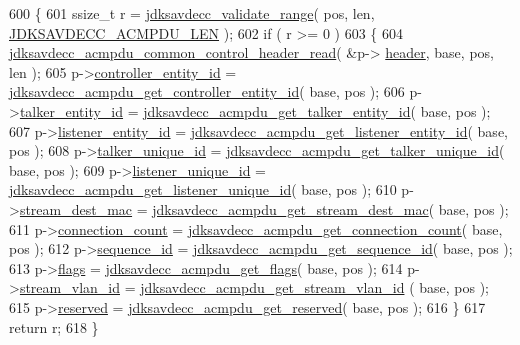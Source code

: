 \begin{DoxyCode}
600 \{
601     ssize\_t r = \hyperlink{group__util_ga9c02bdfe76c69163647c3196db7a73a1}{jdksavdecc\_validate\_range}( pos, len, 
      \hyperlink{group__acmpdu_ga0c49ae21aa302b2800dd04cffd57b475}{JDKSAVDECC\_ACMPDU\_LEN} );
602     \textcolor{keywordflow}{if} ( r >= 0 )
603     \{
604         \hyperlink{group__acmpdu_gaa999105ba3743fa5a7ff66fd2cf7574f}{jdksavdecc\_acmpdu\_common\_control\_header\_read}( &p->
      \hyperlink{structjdksavdecc__acmpdu_a2c237e845db12511d3ddd73770461bed}{header}, base, pos, len );
605         p->\hyperlink{structjdksavdecc__acmpdu_affc928ddb4fc62d1d04a775d36e5f2c8}{controller\_entity\_id} = 
      \hyperlink{group__acmpdu_ga4734ff28226ad92c7382a332e675d24e}{jdksavdecc\_acmpdu\_get\_controller\_entity\_id}( base, pos );
606         p->\hyperlink{structjdksavdecc__acmpdu_a5a263561481c86cc310ff078f7313b6d}{talker\_entity\_id} = 
      \hyperlink{group__acmpdu_ga9efe0b94b146760a8849d872d2a00da7}{jdksavdecc\_acmpdu\_get\_talker\_entity\_id}( base, pos );
607         p->\hyperlink{structjdksavdecc__acmpdu_ae204d36de673d5135ef97cc19a344b37}{listener\_entity\_id} = 
      \hyperlink{group__acmpdu_ga138eb586d71333fa5c27c226373c771f}{jdksavdecc\_acmpdu\_get\_listener\_entity\_id}( base, pos );
608         p->\hyperlink{structjdksavdecc__acmpdu_a0358bf4a1f59922974d1f0cb08fd8ef4}{talker\_unique\_id} = 
      \hyperlink{group__acmpdu_ga1f24a73adfcd4cf526ad8c10a6f2e42f}{jdksavdecc\_acmpdu\_get\_talker\_unique\_id}( base, pos );
609         p->\hyperlink{structjdksavdecc__acmpdu_a13c0b9c45a002c3c35ae4d85a3018c07}{listener\_unique\_id} = 
      \hyperlink{group__acmpdu_ga36867bfc130619cbea38caa3ce54bc89}{jdksavdecc\_acmpdu\_get\_listener\_unique\_id}( base, pos );
610         p->\hyperlink{structjdksavdecc__acmpdu_acb9f6beb748e2b0e9086f809a4b3143d}{stream\_dest\_mac} = 
      \hyperlink{group__acmpdu_gab4aa881e376764517889c5436d57e4d5}{jdksavdecc\_acmpdu\_get\_stream\_dest\_mac}( base, pos );
611         p->\hyperlink{structjdksavdecc__acmpdu_add60d6d8d5c6d6819002418e6e8404fa}{connection\_count} = 
      \hyperlink{group__acmpdu_ga28f4116aa95376ec5378febf22e830b5}{jdksavdecc\_acmpdu\_get\_connection\_count}( base, pos );
612         p->\hyperlink{structjdksavdecc__acmpdu_a8f184eb7c16a6d3a501c383ee8ffa200}{sequence\_id} = \hyperlink{group__acmpdu_gaf20d00ac6431b19d3f1213b4b6bf6fd5}{jdksavdecc\_acmpdu\_get\_sequence\_id}( 
      base, pos );
613         p->\hyperlink{structjdksavdecc__acmpdu_a1e87af3c18a2fd36c61faf89949bdc3f}{flags} = \hyperlink{group__acmpdu_ga06f11c5b5fb71fe01ca397e95848fcb6}{jdksavdecc\_acmpdu\_get\_flags}( base, pos );
614         p->\hyperlink{structjdksavdecc__acmpdu_a8901fae0712dfce7341cdcbe8b43035c}{stream\_vlan\_id} = \hyperlink{group__acmpdu_gafded2a8f72771f4041c5995e1c57a239}{jdksavdecc\_acmpdu\_get\_stream\_vlan\_id}
      ( base, pos );
615         p->\hyperlink{structjdksavdecc__acmpdu_a5a6ed8c04a3db86066924b1a1bf4dad3}{reserved} = \hyperlink{group__acmpdu_ga8fcc754986fe4ee46a648dacea59e6b3}{jdksavdecc\_acmpdu\_get\_reserved}( base, pos );
616     \}
617     \textcolor{keywordflow}{return} r;
618 \}
\end{DoxyCode}


